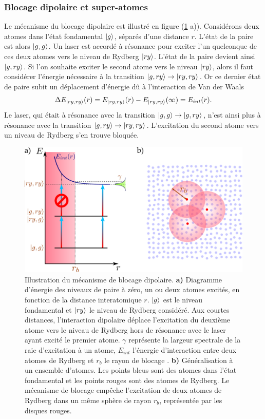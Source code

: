 	\subsubsection*{Blocage dipolaire et super-atomes}
\noindent Le mécanisme du blocage dipolaire est illustré en figure (\ref{fig:dip_block} a)).
Considérons deux atomes dans l'état fondamental $\ket{g}$, séparés d'une distance $r$.
L'état de la paire est alors $\ket{g,g}$.
Un laser est accordé à résonance pour exciter l'un quelconque de ces deux atomes vers le niveau de Rydberg $\ket{ry}$.
L'état de la paire devient ainsi $\ket{g,ry}$.%
Si l'on souhaite exciter le second atome vers le niveau $\ket{ry}$, alors il faut considérer l'énergie nécessaire à la transition $\ket{g,ry} \rightarrow \ket{ry,ry}$.
Or ce dernier état de paire subit un déplacement d'énergie dû à l'interaction de Van der Waals
%
\begin{equation}
\label{eq:DeltaE_block}
\Delta E_{\ket{ry,ry}}(r) = E_{\ket{ry,ry}}(r)-E_{\ket{ry,ry}}(\infty)
= E_{int}(r).
\end{equation}
%
Le laser, qui était à résonance avec la transition $\ket{g,g}\rightarrow\ket{g,ry}$, n'est ainsi plus à résonance avec la transition $\ket{g,ry}\rightarrow\ket{ry,ry}$.
L'excitation du second atome vers un niveau de Rydberg s'en trouve bloquée.

\begin{figure}[!h]
\centering
\includegraphics[height=.3\textheight]{figures/low_l/dip_block}
\caption[Mécanisme du blocage dipolaire]{
Illustration du mécanisme de blocage dipolaire.
\textbf{a)} Diagramme d'énergie des niveaux de paire à zéro, un ou deux atomes excités, en fonction de la distance interatomique $r$.
$\ket{g}$ est le niveau fondamental et $\ket{ry}$ le niveau de Rydberg considéré.
Aux courtes distances, l'interaction dipolaire déplace l'excitation du deuxième atome vers le niveau de Rydberg hors de résonance avec le laser ayant excité le premier atome.
$\gamma$ représente la largeur spectrale de la raie d'excitation à un atome, $E_{int}$ l'énergie d'interaction entre deux atomes de Rydberg et $r_b$ le \og rayon de blocage \fg{}.
\textbf{b)} Généralisation à un ensemble d'atomes. Les points bleus sont des atomes dans l'état fondamental et les points rouges sont des atomes de Rydberg.
Le mécanisme de blocage empêche l'excitation de deux atomes de Rydberg dans un même sphère de rayon $r_b$, représentée par les disques rouges.
}
\label{fig:dip_block}
\end{figure}

